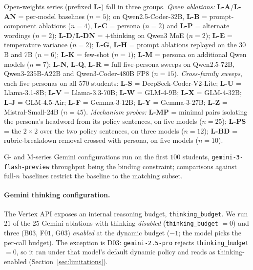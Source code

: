 Open-weights series (prefixed \textbf{L-}) fall in three groups. \emph{Qwen ablations:} \textbf{L-A}/\textbf{L-AN} = per-model baselines ($n{=}5$); on Qwen2.5-Coder-32B, \textbf{L-B} = prompt-component ablations ($n{=}4$), \textbf{L-C} = persona ($n{=}2$) and \textbf{L-P} = alternate wordings ($n{=}2$); \textbf{L-D}/\textbf{L-DN} = $+$thinking on Qwen3 MoE ($n{=}2$); \textbf{L-E} = temperature variance ($n{=}2$); \textbf{L-G}, \textbf{L-H} = prompt ablations replayed on the $30$B and $7$B ($n{=}6$); \textbf{L-K} = few-shot ($n{=}1$); \textbf{L-M} = persona on additional Qwen models ($n{=}7$); \textbf{L-N}, \textbf{L-Q}, \textbf{L-R} = full five-persona sweeps on Qwen2.5-$72$B, Qwen3-$235$B-A$22$B and Qwen3-Coder-$480$B FP8 ($n{=}15$). \emph{Cross-family sweeps}, each five personas on all $570$ students: \textbf{L-S} = DeepSeek-Coder-V2-Lite; \textbf{L-U} = Llama-3.1-$8$B; \textbf{L-V} = Llama-3.3-$70$B; \textbf{L-W} = GLM-4-$9$B; \textbf{L-X} = GLM-4-$32$B; \textbf{L-J} = GLM-4.5-Air; \textbf{L-F} = Gemma-3-$12$B; \textbf{L-Y} = Gemma-3-$27$B; \textbf{L-Z} = Mistral-Small-$24$B ($n{=}45$). \emph{Mechanism probes:} \textbf{L-MP} = minimal pairs isolating the persona's headword from its policy sentences, on five models ($n{=}25$); \textbf{L-PS} = the $2\times2$ over the two policy sentences, on three models ($n{=}12$); \textbf{L-BD} = rubric-breakdown removal crossed with persona, on five models ($n{=}10$).

G- and M-series Gemini configurations run on the first $100$ students, \texttt{gemini-3-flash-preview} throughput being the binding constraint; comparisons against full-$n$ baselines restrict the baseline to the matching subset.

\paragraph{Gemini thinking configuration.}
The Vertex API exposes an internal reasoning budget, \texttt{thinking\_budget}. We run $21$ of the $25$ Gemini ablations with thinking \emph{disabled} (\texttt{thinking\_budget} $= 0$) and three (B$03$, F$01$, G$03$) \emph{enabled} at the dynamic budget ($-1$; the model picks the per-call budget). The exception is D$03$: \texttt{gemini-2.5-pro} rejects \texttt{thinking\_budget} $= 0$, so it ran under that model's default dynamic policy and reads as thinking-enabled (Section~\ref{sec:limitations}).

